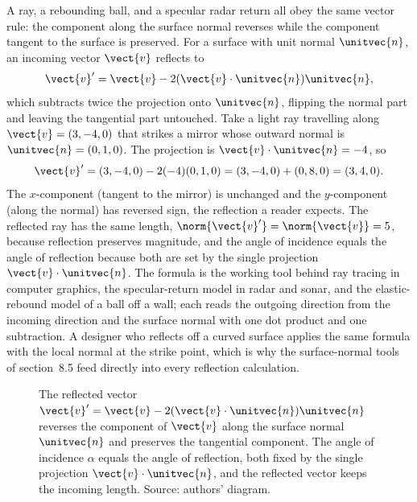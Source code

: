 \begin{example}
A ray, a rebounding ball, and a specular radar return all obey the same
vector rule: the component along the surface normal reverses while the
component tangent to the surface is preserved. For a surface with unit
normal $\unitvec{n}$, an incoming vector $\vect{v}$ reflects to
\[
\vect{v}' = \vect{v} - 2(\vect{v}\cdot\unitvec{n})\unitvec{n},
\]
which subtracts twice the projection onto $\unitvec{n}$, flipping the
normal part and leaving the tangential part untouched. Take a light ray
travelling along $\vect{v} = (3, -4, 0)$ that strikes a mirror whose
outward normal is $\unitvec{n} = (0, 1, 0)$. The projection is
$\vect{v}\cdot\unitvec{n} = -4$, so
\[
\vect{v}' = (3, -4, 0) - 2(-4)(0, 1, 0) = (3, -4, 0) + (0, 8, 0) =
(3, 4, 0).
\]
The $x$-component (tangent to the mirror) is unchanged and the
$y$-component (along the normal) has reversed sign, the reflection a
reader expects. The reflected ray has the same length, $\norm{\vect{v}'}
= \norm{\vect{v}} = 5$, because reflection preserves magnitude, and the
angle of incidence equals the angle of reflection because both are set
by the single projection $\vect{v}\cdot\unitvec{n}$. The formula is the
working tool behind ray tracing in computer graphics, the specular-return
model in radar and sonar, and the elastic-rebound model of a ball off a
wall; each reads the outgoing direction from the incoming direction and
the surface normal with one dot product and one subtraction. A designer
who reflects off a curved surface applies the same formula with the
local normal at the strike point, which is why the surface-normal tools
of section~8.5 feed directly into every reflection calculation.
\end{example}

\begin{figure}[h]
  \centering
  
  \caption[Reflection of a vector off a plane.]{The reflected vector
  $\vect{v}' = \vect{v} - 2(\vect{v}\cdot\unitvec{n})\unitvec{n}$
  reverses the component of $\vect{v}$ along the surface normal
  $\unitvec{n}$ and preserves the tangential component. The angle of
  incidence $\alpha$ equals the angle of reflection, both fixed by the
  single projection $\vect{v}\cdot\unitvec{n}$, and the reflected vector
  keeps the incoming length. Source: authors' diagram.}
  \label{fig:vol02ch08:reflection}
\end{figure}

